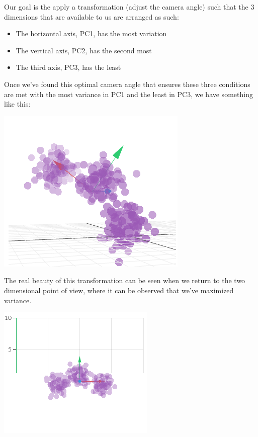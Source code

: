 \documentclass[english, 10pt]{article}
\begin{document}
Our goal is the apply a transformation (adjust the camera angle) such that the 3 dimensions that are available to us are arranged as such:

\begin{itemize}
	\item The horizontal axis, PC1, has the most variation
	\item The vertical axis, PC2, has the second most
	\item The third axis, PC3, has the least
\end{itemize}

Once we've found this optimal camera angle that ensures these three conditions are met with the most variance in PC1 and the least in PC3, we have something like this:\\

{
\centering

\includegraphics[scale=0.65]{img/pca3dafter.png} 

}

\hfill \break The real beauty of this transformation can be seen when we return to the two dimensional point of view, where it can be observed that we've maximized variance.\\

{
\centering

\includegraphics[scale=0.65]{img/pca2dafter.png} 

}
\end{document}
